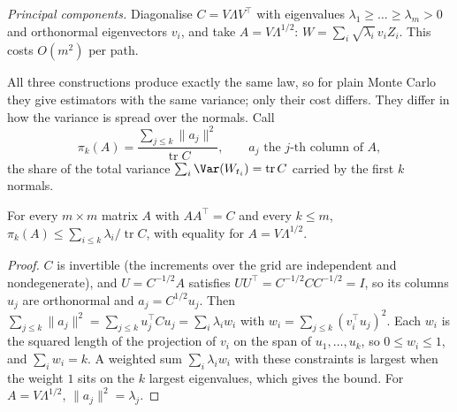 \emph{Principal components.} Diagonalise $C=V\Lambda V^\top$ with eigenvalues
$\lambda_1\ge\dots\ge\lambda_m>0$ and orthonormal eigenvectors $v_i$, and take
$A=V\Lambda^{1/2}$: $W=\sum_i\sqrt{\lambda_i}\,v_iZ_i$. This costs $O(m^2)$ per path.

All three constructions produce exactly the same law, so for plain Monte Carlo they give
estimators with the same variance; only their cost differs. They differ in how the
variance is spread over the normals. Call
\[
  \pi_k(A)=\frac{\sum_{j\le k}\|a_j\|^2}{\operatorname{tr}C},\qquad a_j\text{ the $j$-th column of }A,
\]
the share of the total variance $\sum_i\Var(W_{t_i})=\operatorname{tr}C$ carried by the
first $k$ normals.

\begin{proposition}\label{prop:ps-pca}
For every $m\times m$ matrix $A$ with $AA^\top=C$ and every $k\le m$,
$\pi_k(A)\le\sum_{i\le k}\lambda_i/\operatorname{tr}C$, with equality for $A=V\Lambda^{1/2}$.
\end{proposition}

\begin{proof}
$C$ is invertible (the increments over the grid are independent and nondegenerate), and
$U=C^{-1/2}A$ satisfies $UU^\top=C^{-1/2}CC^{-1/2}=I$, so its columns $u_j$ are
orthonormal and $a_j=C^{1/2}u_j$. Then
$\sum_{j\le k}\|a_j\|^2=\sum_{j\le k}u_j^\top Cu_j=\sum_i\lambda_iw_i$ with
$w_i=\sum_{j\le k}(v_i^\top u_j)^2$. Each $w_i$ is the squared length of the projection of
$v_i$ on the span of $u_1,\dots,u_k$, so $0\le w_i\le1$, and $\sum_iw_i=k$. A weighted sum
$\sum_i\lambda_iw_i$ with these constraints is largest when the weight $1$ sits on the $k$
largest eigenvalues, which gives the bound. For $A=V\Lambda^{1/2}$,
$\|a_j\|^2=\lambda_j$.
\end{proof}

